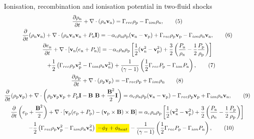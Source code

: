 \documentclass[10pt,aspectratio=169,usenames,dvipsnames]{beamer}
\newcommand{\mathcolorbox}[2]{\colorbox{#1}{$\displaystyle #2$}}
\begin{document}
\begin{frame}{Ionisation, recombination and ionisation potential in two-fluid shocks}
\footnotesize
\begin{gather}
\frac{\partial \rho _{\text{n}}}{\partial t} + \nabla \cdot (\rho _{\text{n}} \textbf{v}_{\text{n}})= \Gamma _{rec} \rho _{\rm p} - \Gamma _{ion} \rho _{\rm n}, \label{eqn:neutral1}\tag{5} \\
\frac{\partial}{\partial t}(\rho _{\text{n}} \textbf{v}_{\text{n}}) + \nabla \cdot (\rho _{\text{n}} \textbf{v}_{\text{n}} \textbf{v}_{\text{n}} + P_{\text{n}} \textbf{I}) = -\alpha _c \rho_{\text{n}} \rho_{\text{p}} (\textbf{v}_{\text{n}}-\textbf{v}_{\text{p}}) + \Gamma _{rec} \rho _{\rm p} \textbf{v}_{\rm p} - \Gamma _{ion} \rho_{\rm n} \textbf{v}_{\rm n},\tag{6} \\
\frac{\partial e_{\text{n}}}{\partial t} + \nabla \cdot \left[\textbf{v}_{\text{n}} (e_{\text{n}} +P_{\text{n}}) \right] = -\alpha _c \rho _{\text{n}} \rho _{\text{p}} \left[ \frac{1}{2} (\textbf{v}_{\text{n}} ^2 - \textbf{v}_{\text{p}} ^2)+ \frac{3}{2} \left(\frac{P_{\rm n}}{\rho_{\rm n}}-\frac{1}{2}\frac{P_{\rm p}}{\rho_{\rm p}}\right) \right] \nonumber \\ \hspace{0.5cm}+ \frac{1}{2} \left( \Gamma _{rec} \rho _{\rm p} \textbf{v}_{\rm p} ^2 - \Gamma _{ion} \rho _{\rm n} \textbf{v}_{\rm n} ^2 \right) +\frac{1}{ (\gamma-1)} \left( \frac{1}{2} \Gamma _{rec} P_{\rm p} -\Gamma _{ion} P_{\rm n} \right), \tag{7}\\
\frac{\partial \rho _{\text{p}}}{\partial t} + \nabla \cdot (\rho_{\text{p}} \textbf{v}_{\text{p}}) = - \Gamma _{rec} \rho _{\rm p} + \Gamma _{ion} \rho _{\rm n} \label{eqn:plasma1}\tag{8}\\
\frac{\partial}{\partial t} (\rho_{\text{p}} \textbf{v}_{\text{p}})+ \nabla \cdot \left( \rho_{\text{p}} \textbf{v}_{\text{p}} \textbf{v}_{\text{p}} + P_{\text{p}} \textbf{I} - \textbf{B B} + \frac{\textbf{B}^2}{2} \textbf{I} \right) = \alpha _c \rho_{\text{n}} \rho_{\text{p}}(\textbf{v}_{\text{n}} - \textbf{v}_{\text{p}}) - \Gamma _{rec} \rho _{\rm p} \textbf{v}_{\rm p} + \Gamma _{ion} \rho_{\rm n} \textbf{v}_{\rm n},\tag{9}\\
\frac{\partial}{\partial t} \left( e_{\text{p}} + \frac{\textbf{B}^2}{2} \right) + \nabla \cdot \left[ \textbf{v}_{\text{p}} ( e_{\text{p}} + P_{\text{p}}) -  (\textbf{v}_{\rm p} \times \textbf{B}) \times \textbf{B} \right]  =  \alpha _c \rho _{\text{n}} \rho _{\text{p}} \left[ \frac{1}{2} (\textbf{v}_{\text{n}} ^2 - \textbf{v}_{\text{p}} ^2)+ \frac{3}{2} \left(\frac{P_{\rm n}}{\rho_{\rm n}}-\frac{1}{2}\frac{P_{\rm p}}{\rho_{\rm p}}\right) \right] \nonumber \\ \hspace{0.5cm}- \frac{1}{2} \left( \Gamma _{rec} \rho _{\rm p} \textbf{v}_{\rm p} ^2 - \Gamma _{ion} \rho _{\rm n} \textbf{v}_{\rm n} ^2 \right) \mathcolorbox{yellow}{- \phi_I + \phi_{heat}} -\frac{1}{ (\gamma-1)} \left( \frac{1}{2} \Gamma _{rec} P_{\rm p} -\Gamma _{ion} P_{\rm n} \right), \label{eqn:ep} \tag{10}\\

\end{gather}
\end{frame}
\end{document}
